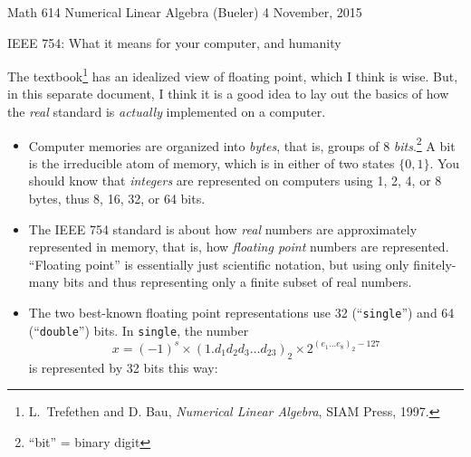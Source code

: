 \documentclass[11pt]{amsart}
\begin{document}
\scriptsize \noindent Math 614 Numerical Linear Algebra (Bueler) \hfill 4 November, 2015
\normalsize

\medskip\bigskip
\Large\centerline{IEEE 754: What it means for your computer, and humanity}

\bigskip\bigskip
\normalsize

\thispagestyle{empty}

The textbook\footnote{L.~Trefethen and D. Bau, \emph{Numerical Linear Algebra}, SIAM Press, 1997.} has an idealized view of floating point, which I think is wise.  But, in this separate document, I think it is a good idea to lay out the basics of how the \emph{real} standard is \emph{actually} implemented on a computer.

\bigskip
\begin{itemize}
\setlength\itemsep{1em}
\item Computer memories are organized into \emph{bytes}, that is, groups of 8 \emph{bits}.\footnote{``bit'' = binary digit}  A bit is the irreducible atom of memory, which is in either of two states $\{0,1\}$.  You should know that \emph{integers} are represented on computers using 1, 2, 4, or 8 bytes, thus 8, 16, 32, or 64 bits.

\item The IEEE 754 standard is about how \emph{real} numbers are approximately represented in memory, that is, how \emph{floating point} numbers are represented.  ``Floating point'' is essentially just scientific notation, but using only finitely-many bits and thus representing only a finite subset of real numbers.

\item The two best-known floating point representations use 32 (``\texttt{single}'') and 64 (``\texttt{double}'') bits.  In \texttt{single}, the number
       $$x = (-1)^s \times \left(1.d_1 d_2 d_3 \dots d_{23}\right)_{2} \times 2^{\left(e_1\dots e_8\right)_2 - 127}$$
is represented by 32 bits this way:

\medskip
\hspace{-30mm}


\end{itemize}
\end{document}
